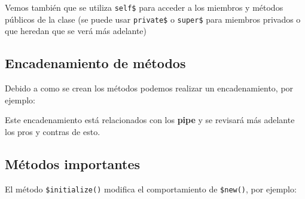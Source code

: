 \documentclass[
]{book}
\newenvironment{Shaded}{\begin{snugshade}}{\end{snugshade}}
\newcommand{\AttributeTok}[1]{\textcolor[rgb]{0.13,0.29,0.53}{#1}}
\newcommand{\ConstantTok}[1]{\textcolor[rgb]{0.56,0.35,0.01}{#1}}
\newcommand{\ControlFlowTok}[1]{\textcolor[rgb]{0.13,0.29,0.53}{\textbf{#1}}}
\newcommand{\DecValTok}[1]{\textcolor[rgb]{0.00,0.00,0.81}{#1}}
\newcommand{\DocumentationTok}[1]{\textcolor[rgb]{0.56,0.35,0.01}{\textbf{\textit{#1}}}}
\newcommand{\FunctionTok}[1]{\textcolor[rgb]{0.13,0.29,0.53}{\textbf{#1}}}
\newcommand{\NormalTok}[1]{#1}
\newcommand{\OtherTok}[1]{\textcolor[rgb]{0.56,0.35,0.01}{#1}}
\newcommand{\SpecialCharTok}[1]{\textcolor[rgb]{0.81,0.36,0.00}{\textbf{#1}}}
\newcommand{\StringTok}[1]{\textcolor[rgb]{0.31,0.60,0.02}{#1}}
\begin{document}
Vemos también que se utiliza \texttt{self\$} para acceder a los miembros y métodos públicos de la clase (se puede usar \texttt{private\$} o \texttt{super\$} para miembros privados o que heredan que se verá más adelante)

\hypertarget{encadenamiento-de-muxe9todos}{%
\subsection{Encadenamiento de métodos}\label{encadenamiento-de-muxe9todos}}

Debido a como se crean los métodos podemos realizar un encadenamiento, por ejemplo:

\begin{Shaded}
\end{Shaded}

Este encadenamiento está relacionados con los \textbf{pipe} y se revisará más adelante los pros y contras de esto.

\hypertarget{muxe9todos-importantes}{%
\subsection{Métodos importantes}\label{muxe9todos-importantes}}

El método \texttt{\$initialize()} modifica el comportamiento de \texttt{\$new()}, por ejemplo:

\begin{Shaded}
\end{Shaded}
\end{document}

